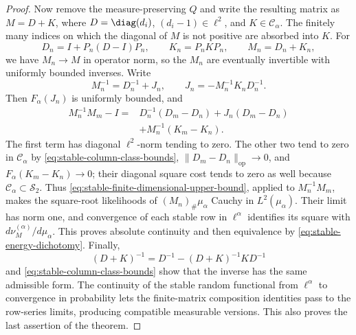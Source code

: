 \begin{proof}
Now remove the measure-preserving \(Q\) and write the resulting matrix as
\(M=D+K\), where \(D=\diag(d_i)\), \((d_i-1)\in\ell^2\), and
\(K\in\mathcal C_\alpha\).
The finitely many indices on which the diagonal of \(M\) is not positive
are absorbed into \(K\).
For
\[
 D_n=I+P_n(D-I)P_n,
 \qquad K_n=P_nKP_n,
 \qquad M_n=D_n+K_n,
\]
we have \(M_n\to M\) in operator norm, so the \(M_n\) are eventually
invertible with uniformly bounded inverses.
Write
\[
 M_n^{-1}=D_n^{-1}+J_n,
 \qquad
 J_n=-M_n^{-1}K_nD_n^{-1}.
\]
Then \(F_\alpha(J_n)\) is uniformly bounded, and
\begin{equation}
 \begin{aligned}
 M_n^{-1}M_m-I
 ={}&D_n^{-1}(D_m-D_n)+J_n(D_m-D_n)\\
    &+M_n^{-1}(K_m-K_n).
 \end{aligned}
 \label{eq:stable-relative-approximants}
\end{equation}
The first term has diagonal \(\ell^2\)-norm tending to zero.
The other two tend to zero in \(\mathcal C_\alpha\) by
\eqref{eq:stable-column-class-bounds},
\(\|D_m-D_n\|_{\mathrm{op}}\to0\), and
\(F_\alpha(K_m-K_n)\to0\); their diagonal square cost tends to zero as
well because \(\mathcal C_\alpha\subset\mathcal S_2\).
Thus \eqref{eq:stable-finite-dimensional-upper-bound}, applied to
\(M_n^{-1}M_m\), makes the square-root likelihoods of
\((M_n)_\#\mu_\alpha\) Cauchy in \(L^2(\mu_\alpha)\).
Their limit has norm one, and convergence of each stable row in
\(\ell^\alpha\) identifies its square with
\(d\nu_M^{(\alpha)}/d\mu_\alpha\).
This proves absolute continuity and then equivalence by
\eqref{eq:stable-energy-dichotomy}.
Finally,
\begin{equation}
 (D+K)^{-1}
 =D^{-1}-(D+K)^{-1}KD^{-1}
 \label{eq:stable-inverse-decomposition}
\end{equation}
and \eqref{eq:stable-column-class-bounds} show that the inverse has the same
admissible form.
The continuity of the stable random functional from \(\ell^\alpha\) to
convergence in probability lets the finite-matrix composition identities
pass to the row-series limits, producing compatible measurable versions.
This also proves the last assertion of the theorem.


\end{proof}
